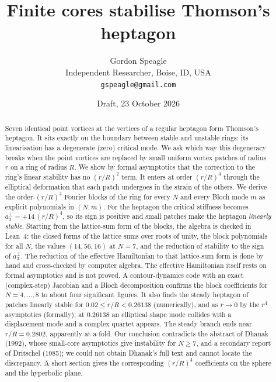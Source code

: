 \documentclass[11pt]{article}
\title{Finite cores stabilise Thomson's heptagon}
\author{Gordon Speagle\\
Independent Researcher, Boise, ID, USA\\
\texttt{gspeagle@gmail.com}}
\date{Draft, 23 October 2026}
\theoremstyle{definition}
\theoremstyle{remark}
\begin{document}
\maketitle

\begin{abstract}
Seven identical point vortices at the vertices of a regular heptagon form Thomson's heptagon. It sits exactly on the
boundary between stable and unstable rings: its linearisation has a degenerate (zero) critical mode. We ask which way
this degeneracy breaks when the point vortices are replaced by small uniform vortex patches of radius $r$ on a ring of
radius $R$. We show by formal asymptotics that the correction to the ring's linear stability has no $(r/R)^2$ term. It
enters at order $(r/R)^4$ through the elliptical deformation that each patch undergoes in the strain of the others. We
derive the order-$(r/R)^4$ Fourier blocks of the ring for every $N$ and every Bloch mode $m$ as explicit polynomials in
$(N,m)$. For the heptagon the critical stiffness becomes $a^\perp_3=+14\,(r/R)^4$, so its sign is positive and small
patches make the heptagon \emph{linearly stable}. Starting from the lattice-sum form of the blocks, the algebra is checked
in Lean~4: the closed forms of the lattice sums over roots of unity, the block polynomials for all $N$, the values
$(14,56,16)$ at $N=7$, and the reduction of stability to the sign of $a^\perp_3$. The reduction of the effective Hamiltonian
to that lattice-sum form is done by hand and cross-checked by computer algebra. The effective Hamiltonian itself rests on
formal asymptotics and is not proved. A contour-dynamics code with an exact (complex-step) Jacobian and a Bloch decomposition confirms the block
coefficients for $N=4,\dots,8$ to about four significant figures. It also finds the steady heptagon of patches linearly
stable for $0.02\le r/R<0.26138$ (numerically), and as $r\to0$ by the $r^4$ asymptotics (formally); at $0.26138$ an elliptical shape mode collides with a displacement mode and a complex quartet
appears. The steady branch ends near $r/R=0.2802$, apparently at a fold. Our conclusion contradicts the abstract of Dhanak (1992), whose
small-core asymptotics give instability for $N\ge7$, and a secondary report of Dritschel (1985); we could not obtain
Dhanak's full text and cannot locate the discrepancy. A short section gives the corresponding $(r/R)^4$ coefficients on
the sphere and the hyperbolic plane.
\end{abstract}

\tableofcontents
\end{document}
